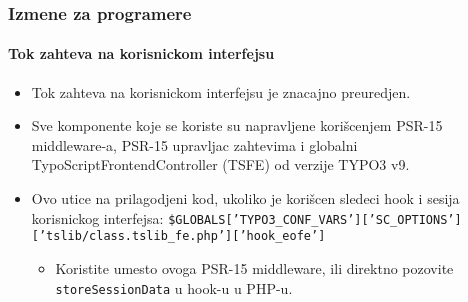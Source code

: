 
\begin{frame}[fragile]
	\frametitle{Izmene za programere}
	\framesubtitle{Tok zahteva na korisnickom interfejsu}

	\lstset{basicstyle=\smaller\ttfamily}

	\begin{itemize}
		\item Tok zahteva na korisnickom interfejsu je znacajno preuredjen.

		\item Sve komponente koje se koriste su napravljene korišcenjem PSR-15 middleware-a, PSR-15 upravljac zahtevima
			i globalni TypoScriptFrontendController (TSFE) od verzije TYPO3 v9.

		\item Ovo utice na prilagodjeni kod, ukoliko je korišcen sledeci hook i sesija korisnickog interfejsa:\newline
			{\fontsize{7}{8}\selectfont\texttt{\$GLOBALS['TYPO3\_CONF\_VARS']['SC\_OPTIONS']['tslib/class.tslib\_fe.php']['hook\_eofe']}}

			\begin{itemize}\smaller
				\item[\ding{228}] Koristite umesto ovoga PSR-15 middleware, ili direktno pozovite \texttt{storeSessionData}
				u hook-u u PHP-u.
			\end{itemize}\normalsize

	\end{itemize}

\end{frame}


